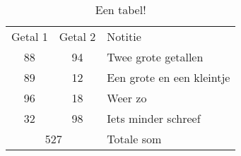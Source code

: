 \documentclass{article}
\begin{document}
\begin{table}[htbp]
    \centering
    \begin{tabular}{c c p{2cm}}
        \toprule
        Getal 1 & Getal 2 & Notitie\\
        \cmidrule(lr){1-2}\cmidrule(lr){3-3}
        88 & 94 & Twee grote getallen\\
        89 & 12 & Een grote en een kleintje\\
        96 & 18 & Weer zo\\
        32 & 98 & Iets minder schreef\\
        \midrule
        \multicolumn{2}{c}{527} & Totale som\\
        \bottomrule
    \end{tabular}
    \caption{Een tabel!}
\end{table}
\end{document}
